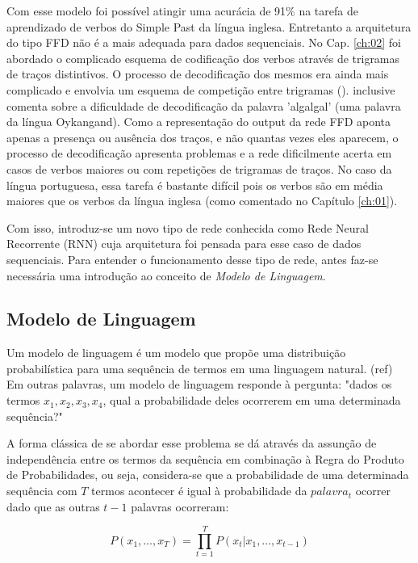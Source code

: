 Com esse modelo foi possível atingir uma acurácia de 91\% na tarefa de aprendizado de verbos do Simple Past da língua inglesa. Entretanto a arquitetura do tipo FFD não é a mais adequada para dados sequenciais. No Cap. \ref{ch:02} foi abordado o complicado esquema de codificação dos verbos através de trigramas de traços distintivos. O processo de decodificação dos mesmos era ainda mais complicado e envolvia um esquema de competição entre trigramas (\cite{rumelhart:1986}). \cite{Pinker:1999} inclusive comenta sobre a dificuldade de decodificação da palavra 'algalgal' (uma palavra da língua Oykangand). Como a representação do output da rede FFD aponta apenas a presença ou ausência dos traços, e não quantas vezes eles aparecem, o processo de decodificação apresenta problemas e a rede dificilmente acerta em casos de verbos maiores ou com repetições de trigramas de traços. No caso da língua portuguesa, essa tarefa é bastante difícil pois os verbos são em média maiores que os verbos da língua inglesa (como comentado no Capítulo \ref{ch:01}). 

Com isso, introduz-se um novo tipo de rede conhecida como Rede Neural Recorrente (RNN) cuja arquitetura foi pensada para esse caso de dados sequenciais. Para entender o funcionamento desse tipo de rede, antes faz-se necessária uma introdução ao conceito de \textit{Modelo de Linguagem}.

\subsection{Modelo de Linguagem}

Um modelo de linguagem é um modelo que propõe uma distribuição probabilística para uma sequência de termos em uma linguagem natural. (ref)%
Em outras palavras, um modelo de linguagem responde à pergunta: "dados os termos $x_1,x_2,x_3,x_4$, qual a probabilidade deles ocorrerem em uma determinada sequência?"

A forma clássica de se abordar esse problema se dá através da assunção de independência entre os termos da sequência em combinação à Regra do Produto de Probabilidades, ou seja, considera-se que a probabilidade de uma determinada sequência com $T$ termos acontecer é igual à probabilidade da $palavra_{t}$ ocorrer dado que as outras $t-1$ palavras ocorreram:

\begin{equation}
P(x_1, \dots, x_T) = \prod_{t=1}^{T} P(x_t \vert x_1, \dots, x_{t-1}) 
\end{equation}

